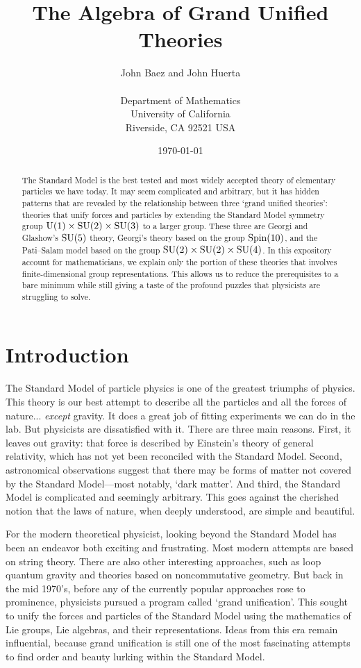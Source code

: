\documentclass{article}
\title{The Algebra of Grand Unified Theories}
\author{John Baez and John Huerta \\
\\
Department of Mathematics \\
University of California \\
Riverside, CA 92521 USA 
}
\date{\today}
\newcommand{\U}{{\rm U}}    %
\newcommand{\SU}{{\rm SU}}    %
\newcommand{\Spin}{{\rm Spin}}    %
\begin{document}
\maketitle

\begin{abstract}
The Standard Model is the best tested and most widely accepted theory of
elementary particles we have today.  It may seem complicated and arbitrary, but
it has hidden patterns that are revealed by the relationship between three
`grand unified theories': theories that unify forces and particles by extending
the Standard Model symmetry group $\U(1) \times \SU(2) \times \SU(3)$ to a
larger group.  These three are Georgi and Glashow's $\SU(5)$ theory,
Georgi's theory based on the group $\Spin(10)$, and the Pati--Salam model based
on the group $\SU(2) \times \SU(2) \times \SU(4)$.  In this expository account
for mathematicians, we explain only the portion of these theories that involves
finite-dimensional group representations.  This allows us to reduce the
prerequisites to a bare minimum while still giving a taste of the profound
puzzles that physicists are struggling to solve.
\end{abstract}

\section{Introduction} \label{sec:introduction}

The Standard Model of particle physics is one of the greatest triumphs
of physics.  This theory is our best attempt to describe all the
particles and all the forces of nature... \textit{except} gravity.  It
does a great job of fitting experiments we can do in the lab.  But
physicists are dissatisfied with it.  There are three main reasons.
First, it leaves out gravity: that force is described by Einstein's
theory of general relativity, which has not yet been reconciled with
the Standard Model.  Second, astronomical observations suggest that
there may be forms of matter not covered by the Standard Model---most
notably, `dark matter'.  And third, the Standard Model is complicated
and seemingly arbitrary.  This goes against the cherished notion that
the laws of nature, when deeply understood, are simple and beautiful.

For the modern theoretical physicist, looking beyond the Standard
Model has been an endeavor both exciting and frustrating.  Most modern
attempts are based on string theory.  There are also other interesting
approaches, such as loop quantum gravity and theories based on
noncommutative geometry.  But back in the mid 1970's, before any of
the currently popular approaches rose to prominence, physicists
pursued a program called `grand unification'.  This sought to unify
the forces and particles of the Standard Model using the mathematics
of Lie groups, Lie algebras, and their representations.  Ideas from
this era remain influential, because grand unification is still one of
the most fascinating attempts to find order and beauty lurking within
the Standard Model.
\end{document}
